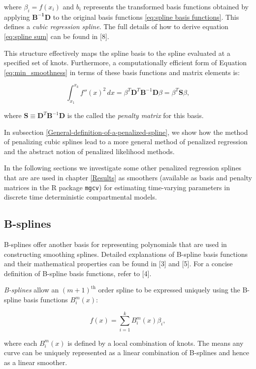 \documentclass[
11pt, %
oneside, %
english, %
singlespacing, %
]{macthesis} %
\begin{document}
where \(\beta_i = f(x_i)\) and \(b_i\) represents the transformed basis functions obtained by applying \(\mathbf{B^{-1}D}\) to the original basis functions \ref{eq:spline basis functions}. This defines a \emph{cubic regression spline}. The full details of how to derive equation \ref{eq:spline sum} can be found in {[}8{]}.

This structure effectively maps the spline basis to the spline evaluated at a specified set of knots. Furthermore, a computationally efficient form of Equation \ref{eq:min_smoothness} in terms of these basis functions and matrix elements is:

\[
\int_{x_1}^{x_k} f''(x)^2 \, dx = \beta^T \mathbf{D}^T \mathbf{B}^{-1} \mathbf{D} \beta =  \beta^T \mathbf{S} \beta,
\]

where \(\mathbf{S} \equiv \mathbf{D}^T \mathbf{B}^{-1} \mathbf{D}\) is the called the \emph{penalty matrix} for this basis.

In subsection \ref{General-definition-of-a-penalized-spline}, we show how the method of penalizing cubic splines lead to a more general method of penalized regression and the abstract notion of penalized likelihood methods.

In the following sections we investigate some other penalized regression splines that are are used in chapter \ref{Results} as smoothers (available as basis and penalty matrices in the R package \texttt{mgcv}) for estimating time-varying parameters in discrete time deterministic compartmental models.

\subsection{B-splines}\label{B-splines}

B-splines offer another basis for representing polynomials that are used in constructing smoothing splines. Detailed explanations of B-spline basis functions and their mathematical properties can be found in {[}3{]} and {[}5{]}. For a concise definition of B-spline basis functions, refer to {[}4{]}.

\emph{B-splines} allow an \((m+1)^{\text{th}}\) order spline to be expressed uniquely using the B-spline basis functions \(B_i^m(x)\):

\[
f(x) = \sum_{i=1}^{k} B_i^m(x) \beta_i,
\]

where each \(B_i^m(x)\) is defined by a local combination of knots. The means any curve can be uniquely represented as a linear combination of B-splines and hence as a linear smoother.
\end{document}
